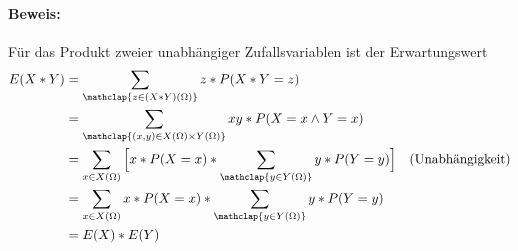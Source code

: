 \paragraph{Beweis:}
Für das Produkt zweier unabhängiger Zufallsvariablen ist der Erwartungswert
\begin{align*}
	E(X*Y)&=\sum_{\mathclap{z\in(X*Y)(\Omega)}}z*P(X*Y=z)\\
	&=\sum_{\mathclap{(x,y)\in X(\Omega)\times Y(\Omega)}}xy*P(X=x \wedge Y=x)\\
	&=\sum_{x\in X(\Omega)}\Big[x*P(X=x) * \sum_{\mathclap{y\in Y(\Omega)}} y*P(Y=y)\Big] &\text{(Unabhängigkeit)}\\
	&=\sum_{x\in X(\Omega)}x*P(X=x)* \sum_{\mathclap{y\in Y(\Omega)}} y*P(Y=y)\\
	&=E(X)*E(Y)
\end{align*}


